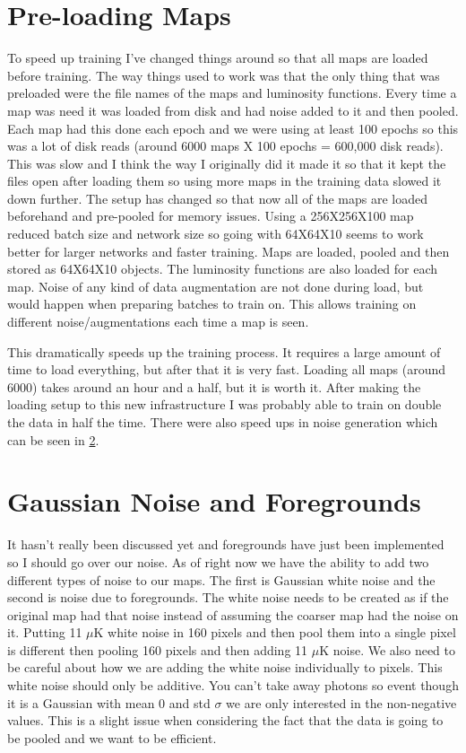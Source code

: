 \documentclass{article}
\begin{document}
	\section{Pre-loading Maps} \label{sec:pre_load}
		To speed up training I've changed things around so that all maps are loaded before training.  The way things used to work was that the only thing that was preloaded were the file names of the maps and luminosity functions.  Every time a map was need it was loaded from disk and had noise added to it and then pooled.  Each map had this done each epoch and we were using at least 100 epochs so this was a lot of disk reads (around 6000 maps X 100 epochs = 600,000 disk reads).  This was slow and I think the way I originally did it made it so that it kept the files open after loading them so using more maps in the training data slowed it down further.  The setup has changed so that now all of the maps are loaded beforehand and pre-pooled for memory issues.  Using a 256X256X100 map reduced batch size and network size so going with 64X64X10 seems to work better for larger networks and faster training.  Maps are loaded, pooled and then stored as 64X64X10 objects.  The luminosity functions are also loaded for each map.  Noise of any kind of data augmentation are not done during load, but would happen when preparing batches to train on.  This allows training on different noise/augmentations each time a map is seen.

		This dramatically speeds up the training process.  It requires a large amount of time to load everything, but after that it is very fast.  Loading all maps (around 6000) takes around an hour and a half, but it is worth it.  After making the loading setup to this new infrastructure I was probably able to train on double the data in half the time.  There were also speed ups in noise generation which can be seen in \cref{sec:noise2}.

	\section{Gaussian Noise and Foregrounds } \label{sec:noise2}
		It hasn't really been discussed yet and foregrounds have just been implemented so I should go over our noise.  As of right now we have the ability to add two different types of noise to our maps.  The first is Gaussian white noise and the second is noise due to foregrounds.  The white noise needs to be created as if the original map had that noise instead of assuming the coarser map had the noise on it.  Putting 11 \(\mu\)K white noise in 160 pixels and then pool them into a single pixel is different then pooling 160 pixels and then adding 11 \(\mu\)K noise.  We also need to be careful about how we are adding the white noise individually to pixels.  This white noise should only be additive.  You can't take away photons so event though it is a Gaussian with mean 0 and std \(\sigma\) we are only interested in the non-negative values.  This is a slight issue when considering the fact that the data is going to be pooled and we want to be efficient.
\end{document}

